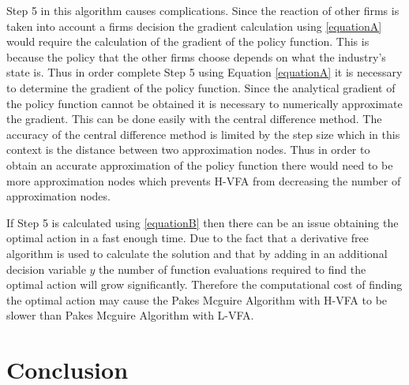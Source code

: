 \documentclass[12pt]{article}
\begin{document}
Step 5 in this algorithm causes complications. Since the reaction of other firms is taken into account a firms decision the gradient calculation using \eqref{equationA} would require the calculation of the gradient of the policy function. This is because the policy that the other firms choose depends on what the industry's state is. Thus in order complete Step 5 using Equation \eqref{equationA} it is necessary to determine the gradient of the policy function. Since the analytical gradient of the policy function cannot be obtained it is necessary to numerically approximate the gradient. This can be done easily with the central difference method. The accuracy of the central difference method is limited by the step size which in this context is the distance between two approximation nodes. Thus in order to obtain an accurate approximation of the policy function there would need to be more approximation nodes which prevents H-VFA from decreasing the number of approximation nodes.

If Step 5 is calculated using \eqref{equationB} then there can be an issue obtaining the optimal action in a fast enough time. Due to the fact that a derivative free algorithm is used to calculate the solution and that by adding in an additional decision variable $y$ the number of function evaluations required to find the optimal action will grow significantly. Therefore the computational cost of finding the optimal action may cause the Pakes Mcguire Algorithm with H-VFA to be slower than Pakes Mcguire Algorithm with L-VFA.




\section{Conclusion}


{}
\end{document}
